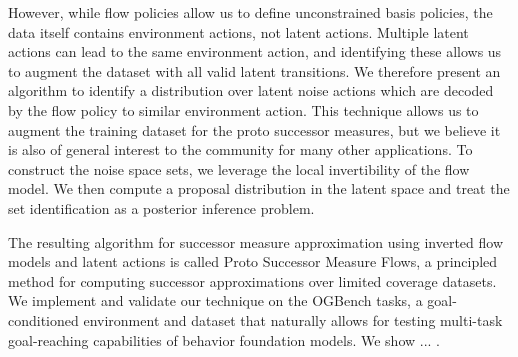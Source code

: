 However, while flow policies allow us to define unconstrained basis policies, the data itself contains environment actions, not latent actions.
Multiple latent actions can lead to the same environment action, and identifying these allows us to augment the dataset with all valid latent transitions.
We therefore present an algorithm to identify a distribution over latent noise actions which are decoded by the flow policy to similar environment action.
This technique allows us to augment the training dataset for the proto successor measures, but we believe it is also of general interest to the community for many other applications.
To construct the noise space sets, we leverage the local invertibility of the flow model.
We then compute a proposal distribution in the latent space and treat the set identification as a posterior inference problem.

The resulting algorithm for successor measure approximation using inverted flow models and latent actions is called Proto Successor Measure Flows, a principled method for computing successor approximations over limited coverage datasets.
We implement and validate our technique on the OGBench tasks, a goal-conditioned environment and dataset that naturally allows for testing multi-task goal-reaching capabilities of behavior foundation models.
We show ... .